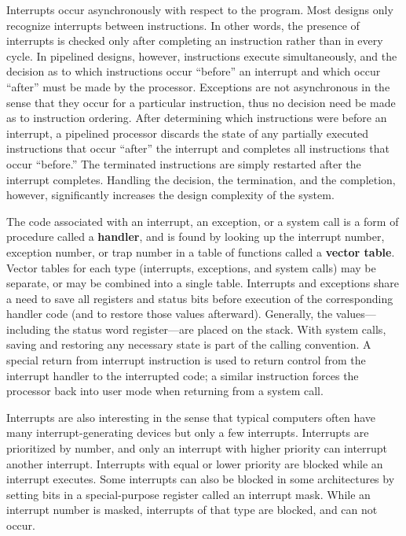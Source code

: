 Interrupts occur asynchronously with respect to the program.  Most
designs only recognize interrupts between instructions.  In other words, 
the presence of interrupts is checked only after completing an instruction
rather than in every cycle.  In pipelined designs, however,
instructions execute simultaneously, and the decision as to which
instructions occur ``before'' an interrupt and which occur ``after''
must be made by the processor.  Exceptions are not asynchronous in the
sense that they occur for a particular instruction, thus no decision
need be made as to instruction ordering.  After determining which
instructions were before an interrupt, a pipelined processor discards
the state of any partially executed instructions that occur ``after''
the interrupt and completes all instructions that occur ``before.''
The terminated instructions are simply restarted after the interrupt
completes.  Handling the decision, the termination, and the
completion, however, significantly increases the design complexity of
the system.

The code associated with an interrupt, an exception, or a system call
is a form of procedure called a {\bf handler}, and is found by looking
up the interrupt number, exception number, or trap number in a table
of functions called a {\bf vector table}.  Vector tables
for each type (interrupts, exceptions, and system calls) may be separate,
or may be combined into a single table.
Interrupts and exceptions share a need to save all registers and
status bits before execution of the corresponding handler code (and to
restore those values afterward).  Generally, the
\mbox{values---including} the status word \mbox{register---are} placed
on the stack.  With system calls, saving and restoring any necessary
state is part of the calling convention.  A special return from
interrupt instruction is used to return control from the interrupt
handler to the interrupted code; a similar instruction forces the
processor back into user mode when returning from a system call.

Interrupts are also interesting in the sense that typical computers
often have many interrupt-generating devices but only a few
interrupts.  Interrupts are prioritized by number, and only an
interrupt with higher priority can interrupt another interrupt.
Interrupts with equal or lower priority are blocked while an interrupt
executes.  Some interrupts can also be blocked in some architectures
by setting bits in a special-purpose register called an interrupt
mask.  While an interrupt number is masked, interrupts of that type
are blocked, and can not occur.

